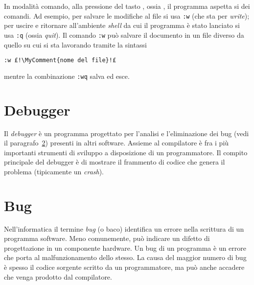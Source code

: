In modalità comando, alla pressione del tasto \key{:}, ossia , il programma aspetta si dei comandi.
Ad esempio, per salvare le modifiche al file si usa \lstinline!:w! (che sta per \emph{write}); per uscire e ritornare all'ambiente \emph{shell} da cui il programma è stato lanciato si usa \lstinline!:q! (ossia \emph{quit}).
Il comando \lstinline!:w! può salvare il documento in un file diverso da quello su cui si sta lavorando tramite la sintassi 
\begin{lstlisting}
:w £!\MyComment{nome del file}!£
\end{lstlisting}
mentre la combinazione \lstinline!:wq! salva ed esce.

	\section{Debugger}
Il \emph{debugger} è un programma progettato per l'analisi e l'eliminazione dei bug (vedi il paragrafo~\ref{sec:bug}) presenti in altri software.
Assieme al compilatore è fra i più importanti strumenti di sviluppo a disposizione di un programmatore.
Il compito principale del debugger è di mostrare il frammento di codice che genera il problema (tipicamente un \emph{crash}).

	\section{Bug}
	\label{sec:bug}
Nell'informatica il termine \emph{bug} (o baco) identifica un errore nella scrittura di un programma software.
Meno comunemente, può indicare un difetto di progettazione in un componente hardware.
Un bug di un programma è un errore che porta al malfunzionamento dello stesso.
La causa del maggior numero di bug è spesso il codice sorgente scritto da un programmatore, ma può anche accadere che venga prodotto dal compilatore.